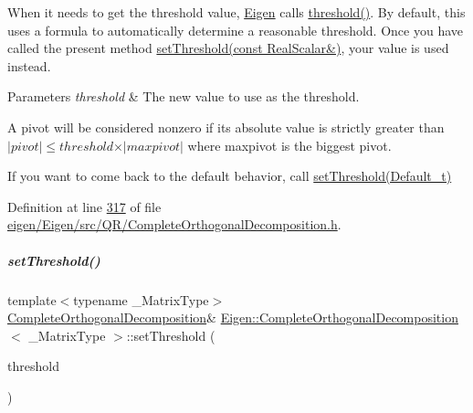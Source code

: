 When it needs to get the threshold value, \hyperlink{namespace_eigen}{Eigen} calls \hyperlink{group___q_r___module_a3909f07268496c0f08f1b57331d91075}{threshold()}. By default, this uses a formula to automatically determine a reasonable threshold. Once you have called the present method \hyperlink{group___q_r___module_aa9c9f7cbde9d58ca5552381b70ad8d82}{set\+Threshold(const Real\+Scalar\&)}, your value is used instead.


\begin{DoxyParams}{Parameters}
{\em threshold} & The new value to use as the threshold.\\
\hline
\end{DoxyParams}
A pivot will be considered nonzero if its absolute value is strictly greater than $ \vert pivot \vert \leqslant threshold \times \vert maxpivot \vert $ where maxpivot is the biggest pivot.

If you want to come back to the default behavior, call \hyperlink{group___q_r___module_a27c8da71874be7a64d6723bd0cae9f4f}{set\+Threshold(\+Default\+\_\+t)} 

Definition at line \hyperlink{eigen_2_eigen_2src_2_q_r_2_complete_orthogonal_decomposition_8h_source_l00317}{317} of file \hyperlink{eigen_2_eigen_2src_2_q_r_2_complete_orthogonal_decomposition_8h_source}{eigen/\+Eigen/src/\+Q\+R/\+Complete\+Orthogonal\+Decomposition.\+h}.

\mbox{\label{group___q_r___module_aa9c9f7cbde9d58ca5552381b70ad8d82}} 
\subparagraph{\texorpdfstring{set\+Threshold()}{setThreshold()}\hspace{0.1cm}{\footnotesize\ttfamily [2/4]}}
{\footnotesize\ttfamily template$<$typename \+\_\+\+Matrix\+Type$>$ \\
\hyperlink{group___q_r___module_class_eigen_1_1_complete_orthogonal_decomposition}{Complete\+Orthogonal\+Decomposition}\& \hyperlink{group___q_r___module_class_eigen_1_1_complete_orthogonal_decomposition}{Eigen\+::\+Complete\+Orthogonal\+Decomposition}$<$ \+\_\+\+Matrix\+Type $>$\+::set\+Threshold (\begin{DoxyParamCaption}\item[{const Real\+Scalar \&}]{threshold }\end{DoxyParamCaption})\hspace{0.3cm}{\ttfamily [inline]}}


